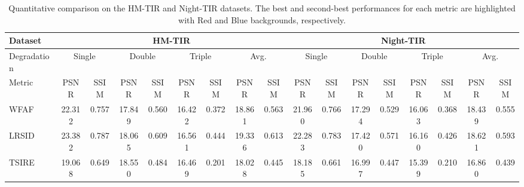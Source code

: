 \begin{table}[t]
    \centering
    \setlength{\tabcolsep}{2.8pt}
    \caption{Quantitative comparison on the  HM-TIR and Night-TIR datasets. The best and second-best performances for each metric are highlighted with \colorbox[HTML]{ffc7ce}{Red} and \colorbox[HTML]{d9e7f4}{Blue} backgrounds, respectively.}
    \small
    \label{tab:QC_HN}
    \begin{threeparttable}
        \vspace{-2mm}
        \begin{tabularx}{\linewidth}{l|cc|cc|cc|cc|cc|cc|cc|cc}
        \toprule
        Dataset&\multicolumn{8}{c|}{HM-TIR}&\multicolumn{8}{c}{Night-TIR}\\
        \midrule
         Degradation&\multicolumn{2}{c|}{Single}&\multicolumn{2}{c|}{Double}& \multicolumn{2}{c|}{Triple}&\multicolumn{2}{c|}{Avg.}&
        \multicolumn{2}{c|}{Single}&\multicolumn{2}{c|}{Double}& \multicolumn{2}{c|}{Triple}&\multicolumn{2}{c}{Avg.}\\
        \midrule
         Metric&PSNR&SSIM&PSNR&SSIM&PSNR&SSIM&PSNR&SSIM&PSNR&SSIM&PSNR&SSIM&PSNR&SSIM&PSNR&SSIM\\
        \midrule
        WFAF~\cite{munch2009stripe} &\footnotesize 22.312& \footnotesize 0.757&\footnotesize 17.849& \footnotesize 0.560&\footnotesize 16.422&\footnotesize 0.372&\footnotesize 18.861&\footnotesize 0.563&\footnotesize 21.960 &\footnotesize 0.766 &\footnotesize 17.294 &\footnotesize 0.529&\footnotesize 16.063 &\footnotesize 0.368 &\footnotesize 18.439 &\footnotesize 0.555\\
        LRSID~\cite{chang2016remote}&\footnotesize 23.382& \footnotesize 0.787&\footnotesize 18.065& \footnotesize 0.609&\footnotesize 16.561&\footnotesize 0.444&\footnotesize 19.336&\footnotesize 0.613&\footnotesize 22.283 &\footnotesize 0.783 &\footnotesize 17.420 &\footnotesize 0.571&\footnotesize 16.160 &\footnotesize 0.426 &\footnotesize 18.621 &\footnotesize 0.593\\
        TSIRE~\cite{pang2023infrared}&\footnotesize 19.068& \footnotesize 0.649&\footnotesize 18.550& \footnotesize 0.484&\footnotesize 16.469&\footnotesize 0.201&\footnotesize 18.028&\footnotesize 0.445&\footnotesize 18.185 &\footnotesize 0.661 &\footnotesize 16.997 &\footnotesize 0.447&\footnotesize 15.399 &\footnotesize 0.210 &\footnotesize 16.860 &\footnotesize 0.439\\

\end{tabularx}
\end{threeparttable}
\end{table}
